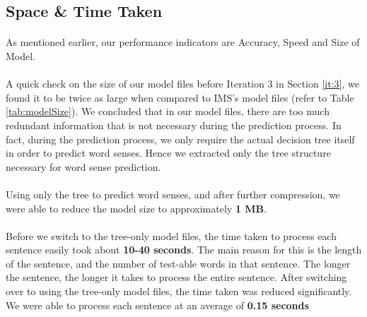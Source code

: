 \subsection{Space \& Time Taken}
\paragraph{}
As mentioned earlier, our performance indicators are Accuracy, Speed and Size of Model.
\paragraph{}
A quick check on the size of our model files before Iteration 3 in Section \ref{it:3}, we found it to be twice as large when compared to IMS's model files (refer to Table \ref{tab:modelSize}). We concluded that in our model files, there are too much redundant information that is not necessary during the prediction process. In fact, during the prediction process, we only require the actual decision tree itself in order to predict word senses. Hence we extracted only the tree structure necessary for word sense prediction.

\paragraph{}
Using only the tree to predict word senses, and after further compression, we were able to reduce the model size to approximately \textbf{1 MB}.

\paragraph{}
Before we switch to the tree-only model files, the time taken to process each sentence easily took about \textbf{10-40 seconds}. The main reason for this is the length of the sentence, and the number of test-able words in that sentence. The longer the sentence, the longer it takes to process the entire sentence. After switching over to using the tree-only model files, the time taken was reduced significantly. We were able to process each sentence at an average of \textbf{0.15 seconds} 